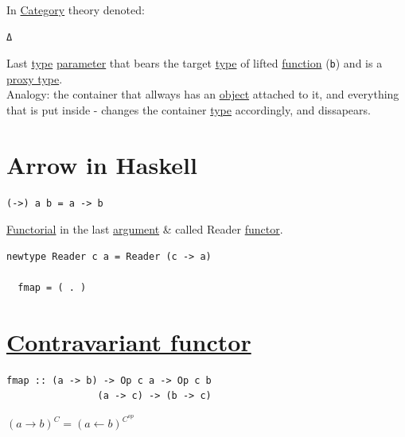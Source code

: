 \documentclass[a4paper,14pt,oneside]{book}
\begin{document}
In \hyperref[org841d8bc]{Category} theory denoted:\\
\begin{verbatim}
Δ
\end{verbatim}

Last \hyperref[orgd6db20c]{type} \hyperref[orged2015b]{parameter} that bears the target \hyperref[orgd6db20c]{type} of lifted \hyperref[org8cc2ae4]{function} (\texttt{b}) and is a \hyperref[org0ebd279]{proxy type}.\\

Analogy: the container that allways has an \hyperref[org5771609]{object} attached to it, and everything that is put inside - changes the container \hyperref[orgd6db20c]{type} accordingly, and dissapears.\\

\chapter{\label{orgbd77861}Arrow in Haskell}
\label{sec:org6c2a92e}

\begin{verbatim}
(->) a b = a -> b
\end{verbatim}
\hyperref[orgfc7d910]{Functorial} in the last \hyperref[org8cb9182]{argument} \& called Reader \hyperref[orge5e236e]{functor}.\\

\begin{verbatim}
newtype Reader c a = Reader (c -> a)

  fmap = ( . )
\end{verbatim}

\chapter{\hyperref[org5884f9d]{Contravariant functor}}
\label{sec:org13fd174}

\begin{verbatim}
fmap :: (a -> b) -> Op c a -> Op c b
                (a -> c) -> (b -> c)
\end{verbatim}


\((a \to b)^{C} = (a \leftarrow b)^{C^{op}}\)\\
\end{document}
